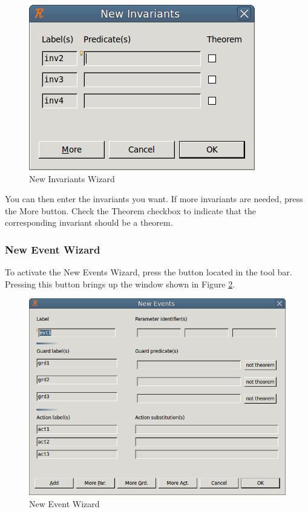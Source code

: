 \begin{figure}[!ht]
\begin{center}
	\includegraphics{img/reference/ref_01_eventb_editor15.png}
	\caption{New Invariants Wizard}
	\label{fig_ref_01_eventb_editor15}
\end{center}
\end{figure}

You can then enter the invariants you want. If more invariants are needed, press the \textsf{More} button. Check the \textsf{Theorem} checkbox to indicate that the corresponding invariant should be a theorem.

\subsubsection{New Event Wizard}

To activate the \textsf{New Events Wizard}, press the  button located in the tool bar. Pressing this button brings up the window shown in Figure \ref{fig_ref_01_eventb_editor16}.

\begin{figure}[!ht]
\begin{center}
	\includegraphics{img/reference/ref_01_eventb_editor16.png}
	\caption{New Event Wizard}
	\label{fig_ref_01_eventb_editor16}
\end{center}
\end{figure}

